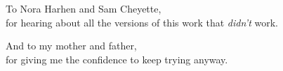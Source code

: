 
To Nora Harhen and Sam Cheyette,\\
for hearing about all the versions of this work that \emph{didn't} work.

\vspace{1em}

And to my mother and father,\\
for giving me the confidence to keep trying anyway.
